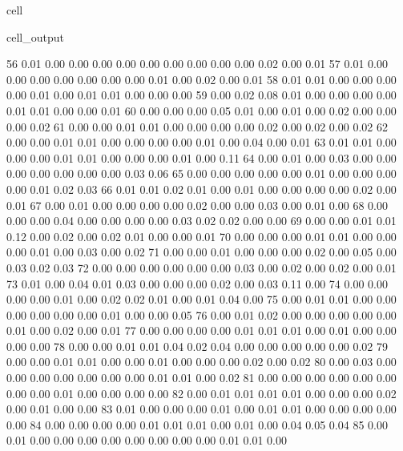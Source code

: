\documentclass[letterpaper,10pt,french]{sphinxmanual}
\begin{document}
\begin{sphinxuseclass}{cell}
\begin{sphinxuseclass}{cell_output}
\begin{sphinxVerbatim}[commandchars=\\\{\}]
        56	0.01 	0.00 	0.00 	0.00 	0.00 	0.00 	0.00 	0.00 	0.00 	0.00 	0.02 	0.00 	0.01
        57	0.01 	0.00 	0.00 	0.00 	0.00 	0.00 	0.00 	0.00 	0.01 	0.00 	0.02 	0.00 	0.01
        58	0.01 	0.01 	0.00 	0.00 	0.00 	0.00 	0.01 	0.00 	0.01 	0.01 	0.00 	0.00 	0.00
        59	0.00 	0.02 	0.08 	0.01 	0.00 	0.00 	0.00 	0.00 	0.01 	0.01 	0.00 	0.00 	0.01
        60	0.00 	0.00 	0.00 	0.05 	0.01 	0.00 	0.01 	0.00 	0.02 	0.00 	0.00 	0.00 	0.02
        61	0.00 	0.00 	0.01 	0.01 	0.00 	0.00 	0.00 	0.00 	0.02 	0.00 	0.02 	0.00 	0.02
        62	0.00 	0.00 	0.01 	0.01 	0.00 	0.00 	0.00 	0.00 	0.01 	0.00 	0.04 	0.00 	0.01
        63	0.01 	0.01 	0.00 	0.00 	0.00 	0.01 	0.01 	0.00 	0.00 	0.00 	0.01 	0.00 	0.11
        64	0.00 	0.01 	0.00 	0.03 	0.00 	0.00 	0.00 	0.00 	0.00 	0.00 	0.00 	0.03 	0.06
        65	0.00 	0.00 	0.00 	0.00 	0.00 	0.01 	0.00 	0.00 	0.00 	0.00 	0.01 	0.02 	0.03
        66	0.01 	0.01 	0.02 	0.01 	0.00 	0.01 	0.00 	0.00 	0.00 	0.00 	0.02 	0.00 	0.01
        67	0.00 	0.01 	0.00 	0.00 	0.00 	0.00 	0.02 	0.00 	0.00 	0.03 	0.00 	0.01 	0.00
        68	0.00 	0.00 	0.00 	0.04 	0.00 	0.00 	0.00 	0.00 	0.03 	0.02 	0.02 	0.00 	0.00
        69	0.00 	0.00 	0.01 	0.01 	0.12 	0.00 	0.02 	0.00 	0.02 	0.01 	0.00 	0.00 	0.01
        70	0.00 	0.00 	0.00 	0.01 	0.01 	0.00 	0.00 	0.00 	0.01 	0.00 	0.03 	0.00 	0.02
        71	0.00 	0.00 	0.01 	0.00 	0.00 	0.00 	0.02 	0.00 	0.05 	0.00 	0.03 	0.02 	0.03
        72	0.00 	0.00 	0.00 	0.00 	0.00 	0.00 	0.03 	0.00 	0.02 	0.00 	0.02 	0.00 	0.01
        73	0.01 	0.00 	0.04 	0.01 	0.03 	0.00 	0.00 	0.00 	0.02 	0.00 	0.03 	0.11 	0.00
        74	0.00 	0.00 	0.00 	0.00 	0.01 	0.00 	0.02 	0.02 	0.01 	0.00 	0.01 	0.04 	0.00
        75	0.00 	0.01 	0.01 	0.00 	0.00 	0.00 	0.00 	0.00 	0.00 	0.01 	0.00 	0.00 	0.05
        76	0.00 	0.01 	0.02 	0.00 	0.00 	0.00 	0.00 	0.00 	0.01 	0.00 	0.02 	0.00 	0.01
        77	0.00 	0.00 	0.00 	0.00 	0.01 	0.01 	0.01 	0.00 	0.01 	0.00 	0.00 	0.00 	0.00
        78	0.00 	0.00 	0.01 	0.01 	0.04 	0.02 	0.04 	0.00 	0.00 	0.00 	0.00 	0.00 	0.02
        79	0.00 	0.00 	0.01 	0.01 	0.00 	0.00 	0.01 	0.00 	0.00 	0.00 	0.02 	0.00 	0.02
        80	0.00 	0.03 	0.00 	0.00 	0.00 	0.00 	0.00 	0.00 	0.00 	0.01 	0.01 	0.00 	0.02
        81	0.00 	0.00 	0.00 	0.00 	0.00 	0.00 	0.00 	0.00 	0.01 	0.00 	0.00 	0.00 	0.00
        82	0.00 	0.01 	0.01 	0.01 	0.01 	0.00 	0.00 	0.00 	0.02 	0.00 	0.01 	0.00 	0.00
        83	0.01 	0.00 	0.00 	0.00 	0.01 	0.00 	0.01 	0.01 	0.00 	0.00 	0.00 	0.00 	0.00
        84	0.00 	0.00 	0.00 	0.00 	0.01 	0.01 	0.01 	0.00 	0.01 	0.00 	0.04 	0.05 	0.04
        85	0.00 	0.01 	0.00 	0.00 	0.00 	0.00 	0.00 	0.00 	0.00 	0.00 	0.01 	0.01 	0.00

\end{sphinxVerbatim}
\end{sphinxuseclass}
\end{sphinxuseclass}
\end{document}
